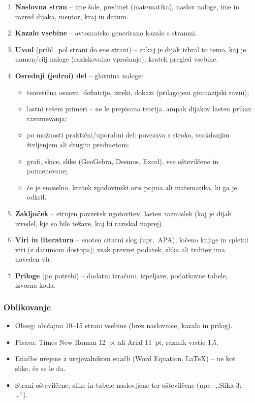 \documentclass[11pt,a4paper]{article}
\begin{document}
\begin{enumerate}
  \item \textbf{Naslovna stran} -- ime šole, predmet (matematika), naslov naloge, ime in razred dijaka, mentor, kraj in datum.
  \item \textbf{Kazalo vsebine} -- avtomatsko generirano kazalo s stranmi.
  \item \textbf{Uvod} (pribl.\ pol strani do ene strani) -- zakaj je dijak izbral to temo, kaj je namen/cilj naloge (raziskovalno vprašanje), kratek pregled vsebine.
  \item \textbf{Osrednji (jedrni) del} -- glavnina naloge:
  \begin{itemize}
    \item teoretična osnova: definicije, izreki, dokazi (prilagojeni gimnazijski ravni);
    \item lastni rešeni primeri -- ne le prepisana teorija, ampak dijakov lasten prikaz razumevanja;
    \item po možnosti praktični/uporabni del: povezava s stroko, vsakdanjim življenjem ali drugim predmetom;
    \item grafi, skice, slike (GeoGebra, Desmos, Excel), vse oštevilčene in poimenovane;
    \item če je smiselno, kratek zgodovinski oris pojma ali matematika, ki ga je odkril.
  \end{itemize}
  \item \textbf{Zaključek} -- strnjen povzetek ugotovitev, lasten razmislek (kaj je dijak izvedel, kje so bile težave, kaj bi raziskal naprej).
  \item \textbf{Viri in literatura} -- enoten citatni slog (npr.\ APA), ločeno knjige in spletni viri (z datumom dostopa); vsak prevzet podatek, slika ali trditev ima naveden vir.
  \item \textbf{Priloge} (po potrebi) -- dodatni izračuni, izpeljave, podatkovne tabele, izvorna koda.
\end{enumerate}

\subsubsection*{Oblikovanje}

\begin{itemize}
  \item Obseg: običajno 10--15 strani vsebine (brez naslovnice, kazala in prilog).
  \item Pisava: Times New Roman 12~pt ali Arial 11~pt, razmik vrstic 1,5.
  \item Enačbe urejene z urejevalnikom enačb (Word Equation, \LaTeX) -- ne kot slike, če se le da.
  \item Strani oštevilčene; slike in tabele naslovljene ter oštevilčene (npr.\ ,,Slika 3: \dots{}``).
\end{itemize}
\end{document}

